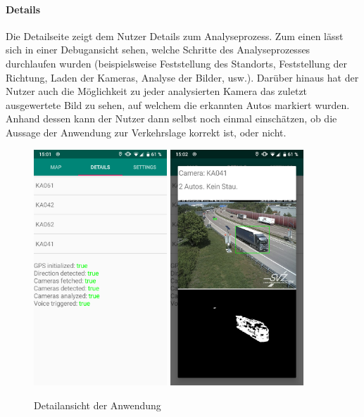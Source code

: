 \paragraph*{Details}
Die Detailseite zeigt dem Nutzer Details zum Analyseprozess.
Zum einen lässt sich in einer Debugansicht sehen, welche Schritte des Analyseprozesses durchlaufen wurden (beispielsweise Feststellung des Standorts, Feststellung der Richtung, Laden der Kameras, Analyse der Bilder, usw.).
Darüber hinaus hat der Nutzer auch die Möglichkeit zu jeder analysierten Kamera das zuletzt ausgewertete Bild zu sehen, auf welchem die erkannten Autos markiert wurden. Anhand dessen kann der Nutzer dann selbst noch einmal einschätzen, ob die Aussage der Anwendung zur Verkehrslage korrekt ist, oder nicht.

\begin{figure}[ht]
   \centering
     \includegraphics[width=5cm]{Bilder/app-details}
     \includegraphics[width=5cm]{Bilder/app-details-cam} \\
 \caption{Detailansicht der Anwendung}
\end{figure}

